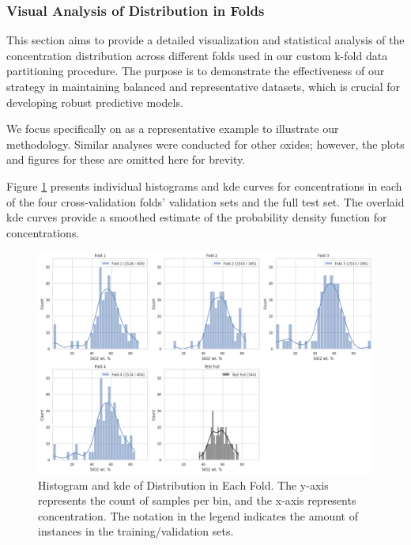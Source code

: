 \subsubsection{Visual Analysis of  Distribution in Folds}
This section aims to provide a detailed visualization and statistical analysis of the  concentration distribution across different folds used in our custom k-fold data partitioning procedure.
The purpose is to demonstrate the effectiveness of our strategy in maintaining balanced and representative datasets, which is crucial for developing robust predictive models.

We focus specifically on  as a representative example to illustrate our methodology.
Similar analyses were conducted for other oxides; however, the plots and figures for these are omitted here for brevity.

Figure \ref{fig:histogram_grid_plot} presents individual histograms and \gls{kde} curves for  concentrations in each of the four cross-validation folds' validation sets and the full test set.
The overlaid \gls{kde} curves provide a smoothed estimate of the probability density function for  concentrations.

\begin{figure}[h!]
    \centering
    \includegraphics[width=\textwidth]{images/histogram_grid_plot.png}
    \caption{Histogram and \gls{kde} of  Distribution in Each Fold. The y-axis represents the count of samples per bin, and the x-axis represents  concentration. The notation in the legend indicates the amount of instances in the training/validation sets.}
    \label{fig:histogram_grid_plot}
\end{figure}

